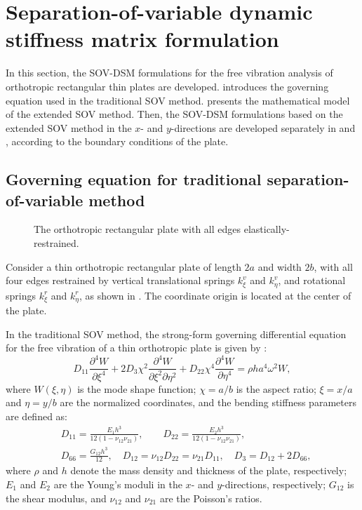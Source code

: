 \documentclass[preprint,12pt,number]{elsarticle}
\begin{document}
\FloatBarrier
\section{Separation-of-variable dynamic stiffness matrix formulation}\label{sec:SOV-DSM}
In this section, the SOV-DSM formulations for the free vibration analysis of orthotropic rectangular thin plates are developed.  
 introduces the governing equation used in the traditional SOV method.
 presents the mathematical model of the extended SOV method.  
Then, the SOV-DSM formulations based on the extended SOV method in the $x$- and $y$-directions are developed separately in  and , according to the boundary conditions of the plate.

\subsection{Governing equation for traditional separation-of-variable method}\label{sec:Mathematical model}
\begin{figure}[!htbp]
\centering
\resizebox{0.8\textwidth}{!}
{
	
}
\caption{\small The orthotropic rectangular plate with all edges elastically-restrained.} 
\label{fig:platemode}
\end{figure}
Consider a thin orthotropic rectangular plate of length $2a$ and width $2b$, with all four edges restrained by vertical translational springs $k^{v}_{\xi}$ and $k^{v}_{\eta}$, and rotational springs $k^{r}_{\xi}$ and $k^{r}_{\eta}$, as shown in .
The coordinate origin is located at the center of the plate.

In the traditional SOV method, the strong-form governing differential equation for the free vibration of a thin orthotropic plate is given by \citep{xing2020improved}: 
%
\begin{equation}\label{eq:governing_EOM}
D_{11}\frac{\partial^4W}{\partial \xi^4} + 2D_3\chi^2\frac{\partial^4W}{\partial \xi^2 \partial \eta^2} + D_{22}\chi^4\frac{\partial^4W}{\partial \eta^4} = \rho ha^4\omega^2W,
\end{equation}
%
where $W(\xi,\eta)$ is the mode shape function; $ \chi = a / b $ is the aspect ratio; $ \xi = x / a $ and $ \eta = y / b $ are the normalized coordinates, and the bending stiffness parameters are defined as:
%
\begin{equation}\label{eq:bd_stiff}
\begin{split}
	&D_{11} = \frac{E_1h^3}{12(1-\nu_{12}\nu_{21})}, \qquad D_{22} = \frac{E_2h^3}{12(1-\nu_{12}\nu_{21})}, \\  
	&D_{66} = \frac{G_{12}h^3}{12}, \quad D_{12} = \nu_{12}D_{22} = \nu_{21}D_{11}, \quad D_3 = D_{12} + 2D_{66},
\end{split}
\end{equation}
%
where $\rho$ and $h$ denote the mass density and thickness of the plate, respectively; $E_1$ and $E_2$ are the Young’s moduli in the $x$- and $y$-directions, respectively; $G_{12}$ is the shear modulus, and $\nu_{12}$ and $\nu_{21}$ are the Poisson’s ratios.
\end{document}
